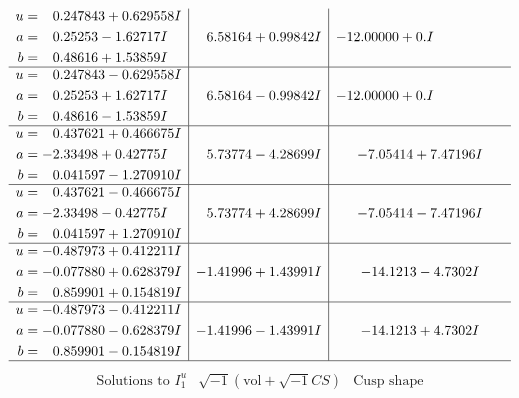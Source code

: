\documentclass[1p]{elsarticle_modified}
\theoremstyle{definition}
\newcommand{\I}{\sqrt{-1}}
\begin{document}
$$\begin{array}{c|c|c}
\begin{aligned}
u &= \phantom{-}0.247843 + 0.629558 I \\
a &= \phantom{-}0.25253 - 1.62717 I \\
b &= \phantom{-}0.48616 + 1.53859 I\end{aligned}
 & \phantom{-}6.58164 + 0.99842 I & -12.00000 + 0. I\phantom{ +0.000000I} \\ \hline\begin{aligned}
u &= \phantom{-}0.247843 - 0.629558 I \\
a &= \phantom{-}0.25253 + 1.62717 I \\
b &= \phantom{-}0.48616 - 1.53859 I\end{aligned}
 & \phantom{-}6.58164 - 0.99842 I & -12.00000 + 0. I\phantom{ +0.000000I} \\ \hline\begin{aligned}
u &= \phantom{-}0.437621 + 0.466675 I \\
a &= -2.33498 + 0.42775 I \\
b &= \phantom{-}0.041597 - 1.270910 I\end{aligned}
 & \phantom{-}5.73774 - 4.28699 I & -7.05414 + 7.47196 I \\ \hline\begin{aligned}
u &= \phantom{-}0.437621 - 0.466675 I \\
a &= -2.33498 - 0.42775 I \\
b &= \phantom{-}0.041597 + 1.270910 I\end{aligned}
 & \phantom{-}5.73774 + 4.28699 I & -7.05414 - 7.47196 I \\ \hline\begin{aligned}
u &= -0.487973 + 0.412211 I \\
a &= -0.077880 + 0.628379 I \\
b &= \phantom{-}0.859901 + 0.154819 I\end{aligned}
 & -1.41996 + 1.43991 I & -14.1213 - 4.7302 I \\ \hline\begin{aligned}
u &= -0.487973 - 0.412211 I \\
a &= -0.077880 - 0.628379 I \\
b &= \phantom{-}0.859901 - 0.154819 I\end{aligned}
 & -1.41996 - 1.43991 I & -14.1213 + 4.7302 I\\
 \hline 
 \end{array}$$\newpage$$\begin{array}{c|c|c}  
\text{Solutions to }I^u_{1}& \I (\text{vol} + \sqrt{-1}CS) & \text{Cusp shape}\\

\end{array}$$
\end{document}
